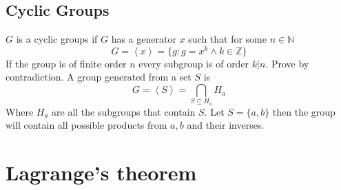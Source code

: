 \documentclass{article}
\newcommand{\N}{\mathbb{N}}
\newcommand{\Z}{\mathbb{Z}}
\begin{document}
	\subsection{Cyclic Groups}
	$G$ is a cyclic groups if $G$ has a generator $x$ such that for some $n\in\N$
	\[	G=\left<x\right>=\{g:g=x^k \land k\in\Z\}
	\]
	If the group is of finite order $n$ every subgroup is of order $k|n$. Prove by contradiction. A group generated from a set $S$ is
	\[	G=\left<S\right>=\bigcap_{S\subseteq H_a}{H_a}
	\]
	Where $H_a$ are all the subgroups that contain $S$. Let $S = \{a,b\}$ then the group will contain all possible products from $a,b$ and their inverses.
	
	\newpage
	\section{Lagrange's theorem}
	
\end{document}
